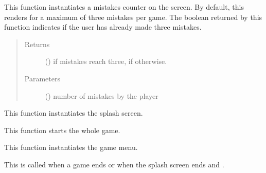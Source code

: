 \documentclass[letterpaper,10pt,english,openany,oneside]{sphinxmanual}
\begin{document}
\begin{fulllineitems}
\label{\detokenize{index:interface.mistakes}}
This function instantiates a mistakes counter on the screen. By default, this renders for a maximum of three
mistakes per game. The boolean returned by this function indicates if the user has already made three mistakes.
\begin{quote}\begin{description}
\item[{Returns}] \leavevmode
()  if mistakes reach three,  if otherwise.

\item[{Parameters}] \leavevmode
{} () \textendash{} number of mistakes by the player

\end{description}\end{quote}

\end{fulllineitems}


\begin{fulllineitems}
\label{\detokenize{index:interface.splash_screen}}
This function instantiates the splash screen.

\end{fulllineitems}


\begin{fulllineitems}
\label{\detokenize{index:interface.start_game}}
This function starts the whole game.

\end{fulllineitems}


\begin{fulllineitems}
\label{\detokenize{index:interface.start_menu}}
This function instantiates the game menu.

This is called when a game ends or when the splash screen ends 
and .

\end{fulllineitems}
\end{document}
